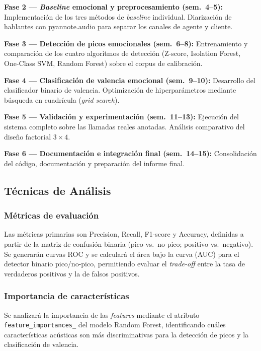 \textbf{Fase 2 — \textit{Baseline} emocional y preprocesamiento (sem.\ 4--5):}
Implementación de los tres métodos de \textit{baseline} individual. Diarización de
hablantes con pyannote.audio para separar los canales de agente y cliente.

\textbf{Fase 3 — Detección de picos emocionales (sem.\ 6--8):}
Entrenamiento y comparación de los cuatro algoritmos de detección (Z-score, Isolation
Forest, One-Class SVM, Random Forest) sobre el corpus de calibración.

\textbf{Fase 4 — Clasificación de valencia emocional (sem.\ 9--10):}
Desarrollo del clasificador binario de valencia. Optimización de hiperparámetros
mediante búsqueda en cuadrícula (\textit{grid search}).

\textbf{Fase 5 — Validación y experimentación (sem.\ 11--13):}
Ejecución del sistema completo sobre las llamadas reales anotadas. Análisis comparativo
del diseño factorial $3 \times 4$.

\textbf{Fase 6 — Documentación e integración final (sem.\ 14--15):}
Consolidación del código, documentación y preparación del informe final.

\subsection{Técnicas de Análisis}
\label{sec:met_analisis}

\subsubsection{Métricas de evaluación}

Las métricas primarias son Precision, Recall, F1-score y Accuracy, definidas a partir
de la matriz de confusión binaria (pico vs.\ no-pico; positivo vs.\ negativo). Se
generarán curvas ROC y se calculará el área bajo la curva (AUC) para el detector
binario pico/no-pico, permitiendo evaluar el \textit{trade-off} entre la tasa de
verdaderos positivos y la de falsos positivos.

\subsubsection{Importancia de características}

Se analizará la importancia de las \textit{features} mediante el atributo
\texttt{feature\_importances\_} del modelo Random Forest, identificando cuáles
características acústicas son más discriminativas para la detección de picos y la
clasificación de valencia.

